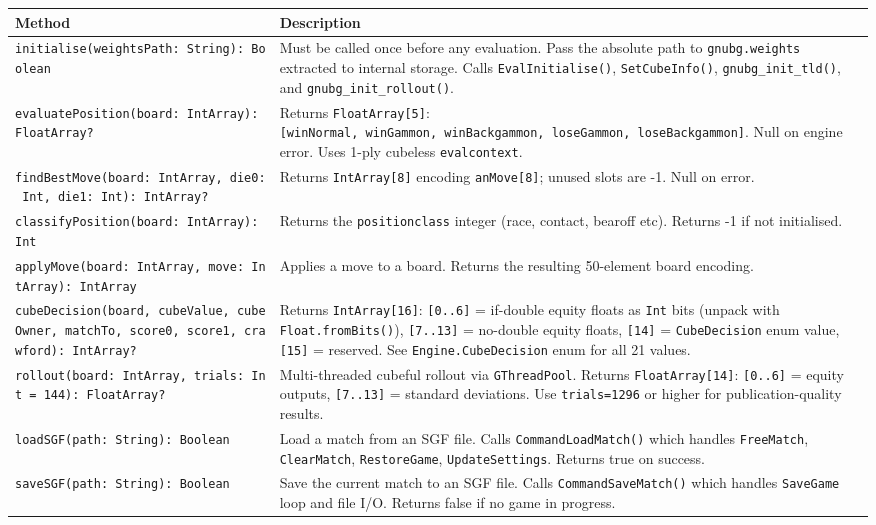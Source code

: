 \documentclass[11pt,a4paper]{article}
\begin{document}
\begin{longtable}[]{@{}
  >{\raggedright\arraybackslash}p{}
  >{\raggedright\arraybackslash}p{}@{}}
\toprule\noalign{}
\begin{minipage}[b]{\linewidth}\raggedright
Method
\end{minipage} & \begin{minipage}[b]{\linewidth}\raggedright
Description
\end{minipage} \\
\midrule\noalign{}
\endhead
\bottomrule\noalign{}
\endlastfoot
\texttt{initialise(weightsPath:\ String):\ Boolean} & Must be called
once before any evaluation. Pass the absolute path to
\texttt{gnubg.weights} extracted to internal storage. Calls
\texttt{EvalInitialise()}, \texttt{SetCubeInfo()},
\texttt{gnubg\_init\_tld()}, and \texttt{gnubg\_init\_rollout()}. \\
\texttt{evaluatePosition(board:\ IntArray):\ FloatArray?} & Returns
\texttt{FloatArray{[}5{]}}:
\texttt{{[}winNormal,\ winGammon,\ winBackgammon,\ loseGammon,\ loseBackgammon{]}}.
Null on engine error. Uses 1-ply cubeless \texttt{evalcontext}. \\
\texttt{findBestMove(board:\ IntArray,\ die0:\ Int,\ die1:\ Int):\ IntArray?}
& Returns \texttt{IntArray{[}8{]}} encoding \texttt{anMove{[}8{]}};
unused slots are -1. Null on error. \\
\texttt{classifyPosition(board:\ IntArray):\ Int} & Returns the
\texttt{positionclass} integer (race, contact, bearoff etc). Returns -1
if not initialised. \\
\texttt{applyMove(board:\ IntArray,\ move:\ IntArray):\ IntArray} &
Applies a move to a board. Returns the resulting 50-element board
encoding. \\
\texttt{cubeDecision(board,\ cubeValue,\ cubeOwner,\ matchTo,\ score0,\ score1,\ crawford):\ IntArray?}
& Returns \texttt{IntArray{[}16{]}}: \texttt{{[}0..6{]}} = if-double
equity floats as \texttt{Int} bits (unpack with
\texttt{Float.fromBits()}), \texttt{{[}7..13{]}} = no-double equity
floats, \texttt{{[}14{]}} = \texttt{CubeDecision} enum value,
\texttt{{[}15{]}} = reserved. See \texttt{Engine.CubeDecision} enum for
all 21 values. \\
\texttt{rollout(board:\ IntArray,\ trials:\ Int\ =\ 144):\ FloatArray?}
& Multi-threaded cubeful rollout via \texttt{GThreadPool}. Returns
\texttt{FloatArray{[}14{]}}: \texttt{{[}0..6{]}} = equity outputs,
\texttt{{[}7..13{]}} = standard deviations. Use \texttt{trials=1296} or
higher for publication-quality results. \\
\texttt{loadSGF(path:\ String):\ Boolean} & Load a match from an SGF
file. Calls \texttt{CommandLoadMatch()} which handles
\texttt{FreeMatch}, \texttt{ClearMatch}, \texttt{RestoreGame},
\texttt{UpdateSettings}. Returns true on success. \\
\texttt{saveSGF(path:\ String):\ Boolean} & Save the current match to an
SGF file. Calls \texttt{CommandSaveMatch()} which handles
\texttt{SaveGame} loop and file I/O. Returns false if no game in
progress. \\
\end{longtable}
\end{document}
